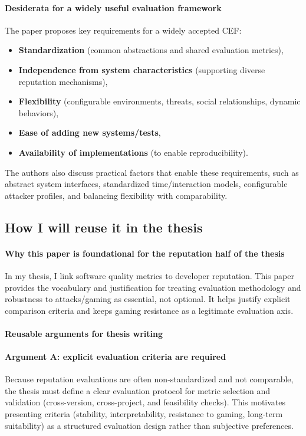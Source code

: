 \documentclass[11pt,a4paper]{article}
\begin{document}
\paragraph{Desiderata for a widely useful evaluation framework}
The paper proposes key requirements for a widely accepted CEF:
\begin{itemize}[leftmargin=*]
  \item \textbf{Standardization} (common abstractions and shared evaluation metrics),
  \item \textbf{Independence from system characteristics} (supporting diverse reputation mechanisms),
  \item \textbf{Flexibility} (configurable environments, threats, social relationships, dynamic behaviors),
  \item \textbf{Ease of adding new systems/tests},
  \item \textbf{Availability of implementations} (to enable reproducibility).
\end{itemize}
The authors also discuss practical factors that enable these requirements, such as abstract system interfaces, standardized time/interaction models, configurable attacker profiles, and balancing flexibility with comparability.

\subsection{How I will reuse it in the thesis}
\paragraph{Why this paper is foundational for the reputation half of the thesis}
In my thesis, I link software quality metrics to developer reputation. This paper provides the vocabulary and justification for treating evaluation methodology and robustness to attacks/gaming as essential, not optional. It helps justify explicit comparison criteria and keeps gaming resistance as a legitimate evaluation axis.

\paragraph{Reusable arguments for thesis writing}
\paragraph{Argument A: explicit evaluation criteria are required}
Because reputation evaluations are often non-standardized and not comparable, the thesis must define a clear evaluation protocol for metric selection and validation (cross-version, cross-project, and feasibility checks). This motivates presenting criteria (stability, interpretability, resistance to gaming, long-term suitability) as a structured evaluation design rather than subjective preferences.
\end{document}
